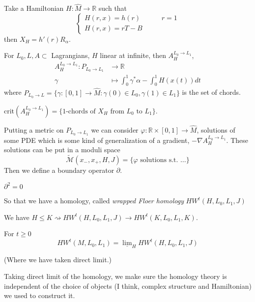 {\begin{remark}
\label{remark-Hamiltonian}
Take a Hamiltonian $H: \hat{M}\to \mathbb{R}$ such that
$$
\begin{cases}
H(r,x)=h(r)\qquad &r=1 \\
H(r,x)=rT-B\qquad &
\end{cases}
$$
then $X_H=h'(r)R_\alpha$.

For $L_0,L,A\subset$ Lagrangians, $H$ linear at infinite,
then $A_{H}^{L_0 \to L_1}$, 
\begin{align*}
A_{H}^{L_0 \to L_1}: P_{L_0\to L_1}  &\longrightarrow \mathbb{R} \\
\gamma &\longmapsto \int_0^1 \gamma^* \alpha- \int_0^1H(x(t))dt
\end{align*}
where $P_{L_0\to L} =\{\gamma:[0,1] \to \hat{M}:\gamma(0) \in L_0,
\gamma(1) \in L_1\}
$ is the set of chords.
\end{remark}

\begin{remark}
\label{remark-1-chords-are-crticial-points}
$\text{crit}(A_{H}^{L_0 \to L_1})=\{\text{1-chords of $X_H$ from 
 $L_0$ to $L_1$}\}$.
\end{remark}

Putting a metric on $P_{L_0 \to L_1}$ we can consider $\varphi:\mathbb{R} \times
[0,1] \to \hat{M}$, solutions of some PDE which is some kind
of generalization of a gradient, $- \nabla A_{H}^{L_0 \to L_1}$.
These solutions can be put in a moduli space
$$
\tilde{\mathcal{M}}(x_-,x_+,H,J)=\{\varphi\text{ solutions s.t. …}\}
$$
Then we define a boundary operator $\partial$.
\begin{theorem}
\label{theorem-homology}
$\partial^2=0$
\end{theorem}

So that we have a homology, called {\it wrapped Floer homology}
$HW^t(H,L_0,L_1,J)$

\begin{remark}
\label{remark-embedding}
We have $H \leq  K \rightsquigarrow HW^t(H,L_0,L_1,J) \to
HW^t(K,L_0,L_1,K)$.
\end{remark}

\begin{definition}
\label{definition-direct-limit}
For $t \geq 0$
$$
HW^t(M,L_0,L_1)=\underline{\lim }_H HW^t(H,L_0,L_1,J)
$$
\end{definition}

(Where we have taken direct limit.) 

Taking direct limit of the homology,
we make sure the homology theory is independent of the
choice of objects (I think, complex structure and Hamiltonian)
we used to construct it.


}
